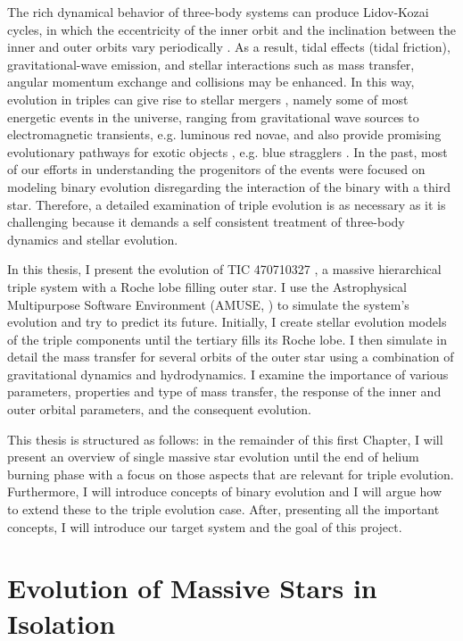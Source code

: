 The rich dynamical behavior of three-body systems can produce Lidov-Kozai cycles, in which the eccentricity of the inner orbit and the inclination between the inner and outer orbits vary periodically \citep{michaely2014secular,toonen2016evolution,mangipudi2022extreme}. As a result, tidal effects (tidal friction), gravitational-wave emission, and stellar interactions such as mass transfer, angular momentum exchange and collisions may be enhanced. In this way, evolution in triples can give rise to stellar mergers \citep{antonini2017binary,vigna2021massive}, namely some of most energetic events in the universe, ranging from gravitational wave sources to electromagnetic transients, e.g. luminous red novae, and also provide promising evolutionary pathways for exotic objects \citep{sana2012binary, toonen2016evolution}, e.g. blue stragglers \citep{winn2009spin}. In the past, most of our efforts in understanding the progenitors of the events were focused on modeling binary evolution disregarding the interaction of the binary with a third star. Therefore, a detailed examination of triple evolution is as necessary as it is challenging because it demands a self consistent treatment of three-body dynamics and stellar evolution.

In this thesis, I present the evolution of TIC 470710327 \citep{eisner2022planet}, a massive hierarchical triple system with a Roche lobe filling outer star. I use the Astrophysical Multipurpose Software Environment (AMUSE, \cite{portegies2018astrophysical}) to simulate the system's evolution and try to predict its future. Initially, I create stellar evolution models of the triple components until the tertiary fills its Roche lobe. I then simulate in detail the mass transfer for several orbits of the outer star using a combination of gravitational dynamics and hydrodynamics. I examine the importance of various parameters, properties and type of mass transfer, the response of the inner and outer orbital parameters, and the consequent evolution.

This thesis is structured as follows: in the remainder of this first Chapter, I will present an overview of single massive star evolution until the end of helium burning phase with a focus on those aspects that are relevant for triple evolution. Furthermore, I will introduce concepts of binary evolution and I will argue how to extend these to the triple evolution case. After, presenting all the important concepts, I will introduce our target system and the goal of this project. 


\section{Evolution of Massive Stars in Isolation}\label{sec:single_star_evolution}

